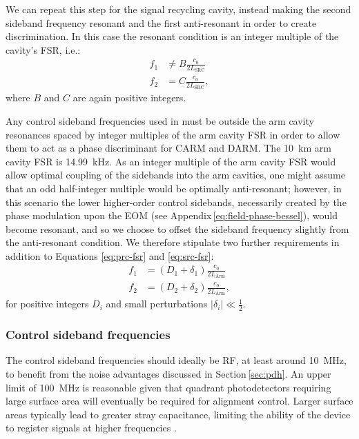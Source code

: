We can repeat this step for the signal recycling cavity, instead making the second sideband frequency resonant and the first anti-resonant in order to create discrimination. In this case the resonant condition is an integer multiple of the cavity's \gls{FSR}, i.e.:
\begin{equation}
  \label{eq:src-fsr}
  \begin{split}
    f_1 &\neq B \frac{c_0}{2 L_{\text{SRC}}} \\
    f_2 &= C \frac{c_0}{2 L_{\text{SRC}}},
  \end{split}
\end{equation}
where $B$ and $C$ are again positive integers.

Any control sideband frequencies used in \ETLF{} must be outside the arm cavity resonances spaced by integer multiples of the arm cavity \gls{FSR} in order to allow them to act as a phase discriminant for \gls{CARM} and \gls{DARM}. The \SI{10}{\kilo\meter} arm cavity \gls{FSR} is \SI{14.99}{\kilo\hertz}. As an integer multiple of the arm cavity \gls{FSR} would allow optimal coupling of the sidebands into the arm cavities, one might assume that an odd half-integer multiple would be optimally anti-resonant; however, in this scenario the lower higher-order control sidebands, necessarily created by the phase modulation upon the \gls{EOM} (see Appendix\,\ref{eq:field-phase-bessel}), would become resonant, and so we choose to offset the sideband frequency slightly from the anti-resonant condition. We therefore stipulate two further requirements in addition to Equations \ref{eq:prc-fsr} and \ref{eq:src-fsr}:
\begin{align}
  \label{eq:arm-fsr}
  f_1 &= \left(D_{1} + \delta_{1} \right) \frac{c_0}{2 L_{\text{Arm}}} \\
  f_2 &= \left(D_{2} + \delta_{2} \right) \frac{c_0}{2 L_{\text{Arm}}},
\end{align}
for positive integers $D_{i}$ and small perturbations $\left| \delta_{i} \right| \ll \frac{1}{2}$.

\subsubsection{Control sideband frequencies}
The control sideband frequencies should ideally be \gls{RF}, at least around \SI{10}{\mega\hertz}, to benefit from the noise advantages discussed in Section\,\ref{sec:pdh}. An upper limit of \SI{100}{\mega\hertz} is reasonable given that quadrant photodetectors requiring large surface area will eventually be required for alignment control. Larger surface areas typically lead to greater stray capacitance, limiting the ability of the device to register signals at higher frequencies \cite{Freise2010}.

